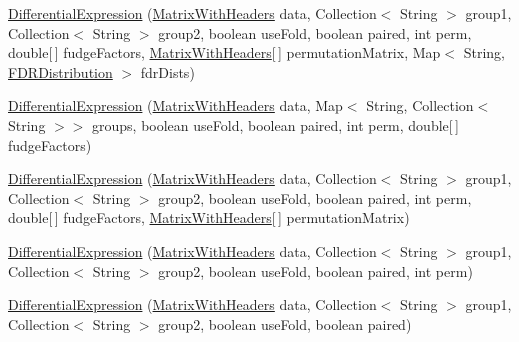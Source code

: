 \begin{DoxyCompactItemize}
\item 
\hyperlink{classbroad_1_1pda_1_1differential_expression_1_1_differential_expression_a514d8744e33305c9abf11b80b4caa499}{Differential\+Expression} (\hyperlink{classbroad_1_1core_1_1datastructures_1_1_matrix_with_headers}{Matrix\+With\+Headers} data, Collection$<$ String $>$ group1, Collection$<$ String $>$ group2, boolean use\+Fold, boolean paired, int perm, double\mbox{[}$\,$\mbox{]} fudge\+Factors, \hyperlink{classbroad_1_1core_1_1datastructures_1_1_matrix_with_headers}{Matrix\+With\+Headers}\mbox{[}$\,$\mbox{]} permutation\+Matrix, Map$<$ String, \hyperlink{classbroad_1_1core_1_1math_1_1_f_d_r_distribution}{F\+D\+R\+Distribution} $>$ fdr\+Dists)
\item 
\hyperlink{classbroad_1_1pda_1_1differential_expression_1_1_differential_expression_a1d74fad415818a10b44b7c58a339afb4}{Differential\+Expression} (\hyperlink{classbroad_1_1core_1_1datastructures_1_1_matrix_with_headers}{Matrix\+With\+Headers} data, Map$<$ String, Collection$<$ String $>$$>$ groups, boolean use\+Fold, boolean paired, int perm, double\mbox{[}$\,$\mbox{]} fudge\+Factors)
\item 
\hyperlink{classbroad_1_1pda_1_1differential_expression_1_1_differential_expression_a8ef2f0ca8378e0decc8835c06941888a}{Differential\+Expression} (\hyperlink{classbroad_1_1core_1_1datastructures_1_1_matrix_with_headers}{Matrix\+With\+Headers} data, Collection$<$ String $>$ group1, Collection$<$ String $>$ group2, boolean use\+Fold, boolean paired, int perm, double\mbox{[}$\,$\mbox{]} fudge\+Factors, \hyperlink{classbroad_1_1core_1_1datastructures_1_1_matrix_with_headers}{Matrix\+With\+Headers}\mbox{[}$\,$\mbox{]} permutation\+Matrix)
\item 
\hyperlink{classbroad_1_1pda_1_1differential_expression_1_1_differential_expression_a80320624701b4ee6a56d039fa72e4c46}{Differential\+Expression} (\hyperlink{classbroad_1_1core_1_1datastructures_1_1_matrix_with_headers}{Matrix\+With\+Headers} data, Collection$<$ String $>$ group1, Collection$<$ String $>$ group2, boolean use\+Fold, boolean paired, int perm)
\item 
\hyperlink{classbroad_1_1pda_1_1differential_expression_1_1_differential_expression_a6b62dc2f901b3771034dc77ff6fb239b}{Differential\+Expression} (\hyperlink{classbroad_1_1core_1_1datastructures_1_1_matrix_with_headers}{Matrix\+With\+Headers} data, Collection$<$ String $>$ group1, Collection$<$ String $>$ group2, boolean use\+Fold, boolean paired)
\item 
$$
\end{DoxyCompactItemize}
